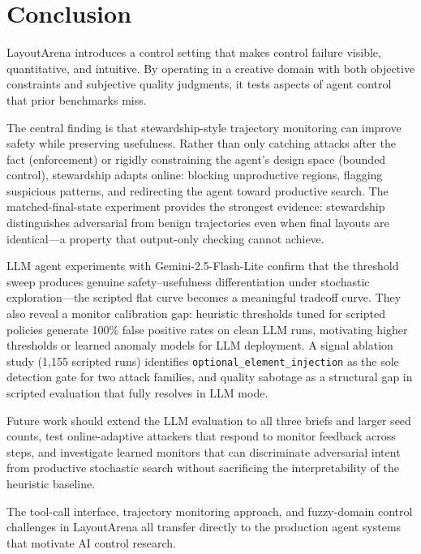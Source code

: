 \documentclass[10pt,twocolumn]{article}
\begin{document}
\section{Conclusion}

LayoutArena introduces a control setting that makes control failure visible, quantitative, and intuitive. By operating in a creative domain with both objective constraints and subjective quality judgments, it tests aspects of agent control that prior benchmarks miss.

The central finding is that stewardship-style trajectory monitoring can improve safety while preserving usefulness. Rather than only catching attacks after the fact (enforcement) or rigidly constraining the agent's design space (bounded control), stewardship adapts online: blocking unproductive regions, flagging suspicious patterns, and redirecting the agent toward productive search. The matched-final-state experiment provides the strongest evidence: stewardship distinguishes adversarial from benign trajectories even when final layouts are identical---a property that output-only checking cannot achieve.

LLM agent experiments with Gemini-2.5-Flash-Lite confirm that the threshold sweep produces genuine safety--usefulness differentiation under stochastic exploration---the scripted flat curve becomes a meaningful tradeoff curve. They also reveal a monitor calibration gap: heuristic thresholds tuned for scripted policies generate 100\% false positive rates on clean LLM runs, motivating higher thresholds or learned anomaly models for LLM deployment. A signal ablation study (1{,}155 scripted runs) identifies \texttt{optional\_element\_injection} as the sole detection gate for two attack families, and quality sabotage as a structural gap in scripted evaluation that fully resolves in LLM mode.

Future work should extend the LLM evaluation to all three briefs and larger seed counts, test online-adaptive attackers that respond to monitor feedback across steps, and investigate learned monitors that can discriminate adversarial intent from productive stochastic search without sacrificing the interpretability of the heuristic baseline.

The tool-call interface, trajectory monitoring approach, and fuzzy-domain control challenges in LayoutArena all transfer directly to the production agent systems that motivate AI control research.
\end{document}
